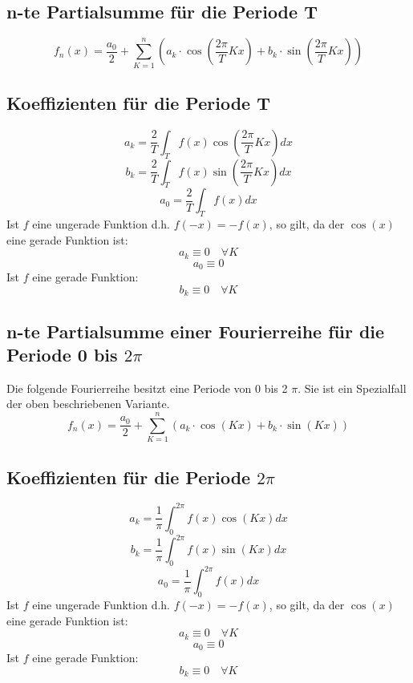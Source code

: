 \subsection{n-te Partialsumme für die Periode T}\label{subsec:fouriert}
\[ \boxed{f_n(x) = \frac{a_0}{2} + \sum_{K=1}^n \left(a_k \cdot 
\cos\left(\frac{2 \pi}{T} K x\right) + b_k \cdot 
\sin\left(\frac{2 \pi}{T} K x\right)\right)} \]

\subsection{Koeffizienten für die Periode T}
\[ \boxed{a_k = \frac{2}{T} \int_T f(x) \cos(\frac{2 \pi}{T} K x) dx} \]
\[ \boxed{b_k = \frac{2}{T} \int_T f(x) \sin(\frac{2 \pi}{T} K x) dx} \]
\[ \boxed{a_0 = \frac{2}{T} \int_T f(x) dx
} \]
Ist $f$ eine ungerade Funktion d.h. $f(-x) = -f(x)$, so gilt, da der $\cos(x)$ 
eine gerade Funktion ist: 
\[ a_k \equiv 0 \quad \forall K\]
\[ a_0 \equiv 0 \]
Ist $f$ eine gerade Funktion: 
\[ b_k \equiv 0 \quad \forall K \]

\subsection{n-te Partialsumme einer Fourierreihe für die Periode 0 bis $2\pi$}
\label{subsec:fourierpi}
Die folgende Fourierreihe besitzt eine Periode von 0 bis 2 $\pi$.
Sie ist ein Spezialfall der oben beschriebenen Variante.
\[ \boxed{f_n(x) = \frac{a_0}{2} + \sum_{K=1}^n \left(a_k \cdot \cos(Kx) + b_k 
\cdot \sin(Kx)\right)} \]

\subsection{Koeffizienten für die Periode $2\pi$}
\[ \boxed{a_k = \frac{1}{\pi} \int_0^{2 \pi} f(x) \cos(K x) dx} \]
\[ \boxed{b_k = \frac{1}{\pi} \int_0^{2 \pi} f(x) \sin(K x) dx} \]
\[ \boxed{a_0 = \frac{1}{\pi} \int_0^{2 \pi} f(x) dx
} \]
Ist $f$ eine ungerade Funktion d.h. $f(-x) = -f(x)$, so gilt, da der $\cos(x)$ 
eine gerade Funktion ist: 
\[ a_k \equiv 0 \quad \forall K\]
\[ a_0 \equiv 0 \]
Ist $f$ eine gerade Funktion: 
\[ b_k \equiv 0 \quad \forall K \]

